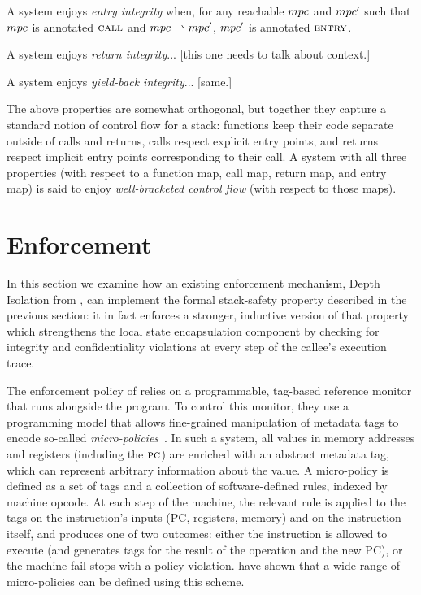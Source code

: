 \documentclass[acmsmall,review,anonymous]{acmart}\settopmatter{printfolios=true,printccs=false,printacmref=false}
\begin{document}
A system enjoys {\em entry integrity} when, for any reachable \(mpc\) and
\(mpc'\) such that \(mpc\) is annotated \(\text{\sc call}\) and
\(mpc \overset{}{\rightharpoonup} mpc'\), \(mpc'\) is annotated \(\text{\sc entry}\).

A system enjoys {\em return integrity}... [this one needs to talk about context.]

A system enjoys {\em yield-back integrity}... [same.]

The above properties are somewhat orthogonal, but together they
capture a standard notion of control flow for a stack: functions keep
their code separate outside of calls and returns, calls respect
explicit entry points, and returns respect implicit entry points
corresponding to their call.  A system with all three
properties (with respect to a function map, call map, return map,
and entry map) is said to enjoy
{\em well-bracketed control flow} (with respect to those maps).

\section{Enforcement}
\label{sec:enforcement}

In this section we examine how an existing enforcement mechanism,
Depth Isolation from \citet{DBLP:conf/sp/RoesslerD18}, can implement
the formal stack-safety property described in the previous section: it in
fact enforces a stronger, inductive version of that property which strengthens the
local state encapsulation component by checking for integrity and
confidentiality violations at every step of the callee's execution trace.

%
The enforcement policy of \citeauthor{DBLP:conf/sp/RoesslerD18} relies
on a programmable, tag-based reference monitor that runs alongside the
program.  To control this monitor, they use a programming model that
allows fine-grained manipulation of metadata tags to encode so-called
\emph{micro-policies}~\citep{pump_oakland2015}.
In such a system, all values in
memory addresses and registers (including the $\textsc{pc}$)
are enriched with an abstract metadata tag, which can represent
arbitrary information about the value. A micro-policy is defined as a set of tags and a
collection of software-defined rules, indexed by machine opcode.
At each step of the machine, the relevant rule is applied to the tags on
the instruction's inputs (PC, registers, memory) and on the instruction itself, and produces
one of two outcomes: either the instruction is allowed to execute (and generates
tags for the result of the operation and the new PC), or the machine
fail-stops with a policy violation.
\citeauthor{pump_oakland2015} have shown that a wide range of micro-policies can
be defined using this scheme.
\end{document}
